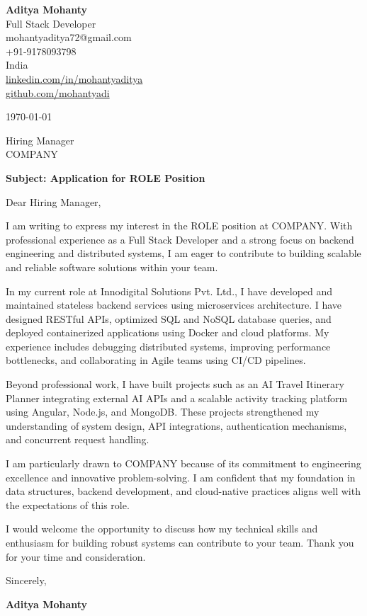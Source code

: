 \documentclass[11pt,a4paper]{letter}
\begin{document}

{\Large\textbf{Aditya Mohanty}} \\
Full Stack Developer \\
mohantyaditya72@gmail.com \\
+91-9178093798 \\
India \\
\href{https://linkedin.com/in/mohantyaditya}{linkedin.com/in/mohantyaditya} \\
\href{https://github.com/mohantyadi}{github.com/mohantyadi}

\vspace{16pt}

\today

\vspace{16pt}

Hiring Manager \\
{{COMPANY}} \\

\vspace{12pt}

\textbf{Subject: Application for {{ROLE}} Position}

\vspace{12pt}

Dear Hiring Manager,

I am writing to express my interest in the {{ROLE}} position at {{COMPANY}}. With professional experience as a Full Stack Developer and a strong focus on backend engineering and distributed systems, I am eager to contribute to building scalable and reliable software solutions within your team.

In my current role at Innodigital Solutions Pvt. Ltd., I have developed and maintained stateless backend services using microservices architecture. I have designed RESTful APIs, optimized SQL and NoSQL database queries, and deployed containerized applications using Docker and cloud platforms. My experience includes debugging distributed systems, improving performance bottlenecks, and collaborating in Agile teams using CI/CD pipelines.

Beyond professional work, I have built projects such as an AI Travel Itinerary Planner integrating external AI APIs and a scalable activity tracking platform using Angular, Node.js, and MongoDB. These projects strengthened my understanding of system design, API integrations, authentication mechanisms, and concurrent request handling.

I am particularly drawn to {{COMPANY}} because of its commitment to engineering excellence and innovative problem-solving. I am confident that my foundation in data structures, backend development, and cloud-native practices aligns well with the expectations of this role.

I would welcome the opportunity to discuss how my technical skills and enthusiasm for building robust systems can contribute to your team. Thank you for your time and consideration.

\vspace{16pt}

Sincerely, \\

\vspace{20pt}

\textbf{Aditya Mohanty}
\end{document}
